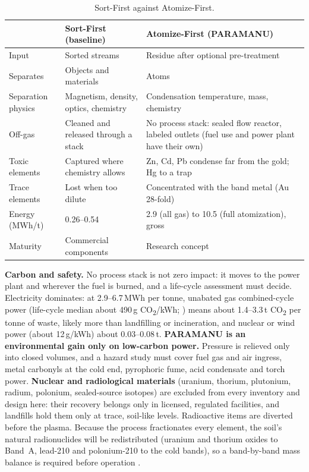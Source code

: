 \documentclass[11pt,a4paper]{article}
\theoremstyle{definition}
\theoremstyle{plain}
\theoremstyle{remark}
\begin{document}
\begin{table}[!htbp]
\centering
\caption{Sort-First against Atomize-First.}\label{tab:compare}
\footnotesize
\begin{tabular}{@{}p{3.1cm}p{5.2cm}p{5.6cm}@{}}
\toprule
 & \textbf{Sort-First (baseline)} & \textbf{Atomize-First (PARAMANU)} \\
\midrule
Input & Sorted streams & Residue after optional pre-treatment \\
Separates & Objects and materials & Atoms \\
Separation physics & Magnetism, density, optics, chemistry & Condensation temperature, mass, chemistry \\
Off-gas & Cleaned and released through a stack & No process stack: sealed flow reactor, labeled outlets (fuel use and power plant have their own) \\
Toxic elements & Captured where chemistry allows & Zn, Cd, Pb condense far from the gold; Hg to a trap \\
Trace elements & Lost when too dilute & Concentrated with the band metal (Au 28-fold) \\
Energy (MWh/t) & 0.26--0.54 & 2.9 (all gas) to 10.5 (full atomization), gross \\
Maturity & Commercial components & Research concept \\
\bottomrule
\end{tabular}
\end{table}

\textbf{Carbon and safety.} No process stack is not zero impact: it moves to the power plant and wherever the fuel is burned, and a life-cycle assessment \citep{iso14040,iso14044} must decide. Electricity dominates: at 2.9--6.7\,MWh per tonne, unabated gas combined-cycle power (life-cycle median about 490\,g CO\textsubscript{2}/kWh; \citealp{schlomer2014}) means about 1.4--3.3\,t CO\textsubscript{2} per tonne of waste, likely more than landfilling or incineration, and nuclear or wind power (about 12\,g/kWh) about 0.03--0.08\,t. \textbf{PARAMANU is an environmental gain only on low-carbon power.} Pressure is relieved only into closed volumes, and a hazard study must cover fuel gas and air ingress, metal carbonyls at the cold end, pyrophoric fume, acid condensate and torch power. \textbf{Nuclear and radiological materials} (uranium, thorium, plutonium, radium, polonium, sealed-source isotopes) are excluded from every inventory and design here: their recovery belongs only in licensed, regulated facilities, and landfills hold them only at trace, soil-like levels. Radioactive items are diverted before the plasma. Because the process fractionates every element, the soil's natural radionuclides will be redistributed (uranium and thorium oxides to Band~A, lead-210 and polonium-210 to the cold bands), so a band-by-band mass balance is required before operation \citep{nrc10cfr40}.
\end{document}
